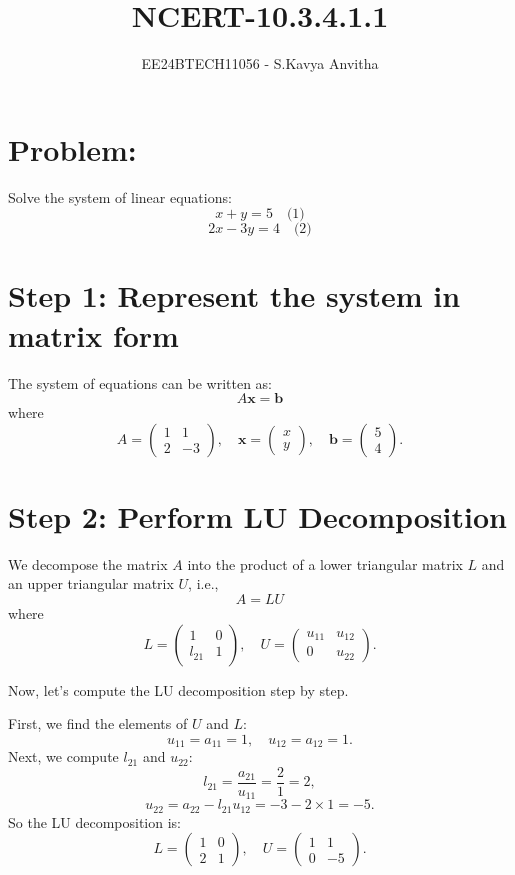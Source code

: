 \documentclass[journal]{IEEEtran}
\begin{document}

\vspace{3cm}

\title{NCERT-10.3.4.1.1}
\author{EE24BTECH11056 - S.Kavya Anvitha}
\maketitle
\bigskip

\renewcommand{\thefigure}{\theenumi}
\renewcommand{\thetable}{\theenumi}
\section*{Problem:}
Solve the system of linear equations:
\[
x + y = 5 \quad \text{(1)}
\]
\[
2x - 3y = 4 \quad \text{(2)}
\]

\section*{Step 1: Represent the system in matrix form}
The system of equations can be written as:
\[
A \mathbf{x} = \mathbf{b}
\]
where
\[
A = \begin{pmatrix} 1 & 1 \\ 2 & -3 \end{pmatrix}, \quad \mathbf{x} = \begin{pmatrix} x \\ y \end{pmatrix}, \quad \mathbf{b} = \begin{pmatrix} 5 \\ 4 \end{pmatrix}.
\]

\section*{Step 2: Perform LU Decomposition}
We decompose the matrix \(A\) into the product of a lower triangular matrix \(L\) and an upper triangular matrix \(U\), i.e., 
\[
A = LU
\]
where
\[
L = \begin{pmatrix} 1 & 0 \\ l_{21} & 1 \end{pmatrix}, \quad U = \begin{pmatrix} u_{11} & u_{12} \\ 0 & u_{22} \end{pmatrix}.
\]

Now, let's compute the LU decomposition step by step.

First, we find the elements of \(U\) and \(L\):
\[
u_{11} = a_{11} = 1, \quad u_{12} = a_{12} = 1.
\]
Next, we compute \(l_{21}\) and \(u_{22}\):
\[
l_{21} = \frac{a_{21}}{u_{11}} = \frac{2}{1} = 2,
\]
\[
u_{22} = a_{22} - l_{21} u_{12} = -3 - 2 \times 1 = -5.
\]
So the LU decomposition is:
\[
L = \begin{pmatrix} 1 & 0 \\ 2 & 1 \end{pmatrix}, \quad U = \begin{pmatrix} 1 & 1 \\ 0 & -5 \end{pmatrix}.
\]
\end{document}
